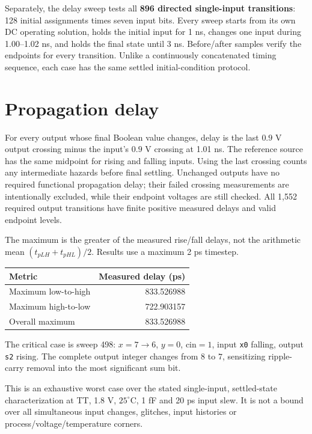 \documentclass[11pt,a4paper]{article}
\begin{document}
Separately, the delay sweep tests all \textbf{896 directed single-input
transitions}: 128 initial assignments times seven input bits. Every sweep
starts from its own DC operating solution, holds the initial input for
1 ns, changes one input during 1.00--1.02 ns, and holds the final state
until 3 ns. Before/after samples verify the endpoints for every transition.
Unlike a continuously concatenated timing sequence, each case has the same
settled initial-condition protocol.

\section*{Propagation delay}
For every output whose final Boolean value changes, delay is the last
$0.9$ V output crossing minus the input's $0.9$ V crossing at 1.01 ns.
The reference source has the same midpoint for rising and falling inputs.
Using the last crossing counts any intermediate hazards before final
settling. Unchanged outputs have no required functional propagation delay;
their failed crossing measurements are intentionally excluded, while their
endpoint voltages are still checked. All 1,552 required output transitions
have finite positive measured delays and valid endpoint levels.

The maximum is the greater of the measured rise/fall delays, not the
arithmetic mean $(t_{pLH}+t_{pHL})/2$. Results use a maximum 2 ps timestep.
\begin{center}\begin{tabular}{lr}
\toprule Metric&Measured delay (ps)\\\midrule
Maximum low-to-high&833.526988\\
Maximum high-to-low&722.903157\\
Overall maximum&833.526988\\\bottomrule
\end{tabular}\end{center}
The critical case is sweep 498: $x=7\to6$, $y=0$, $\mathrm{cin}=1$,
input \texttt{x0} falling, output \texttt{s2} rising. The complete output
integer changes from $8$ to $7$, sensitizing ripple-carry removal into the
most significant sum bit.

This is an exhaustive worst case over the stated single-input, settled-state
characterization at TT, 1.8 V, $25^\circ$C, 1 fF and 20 ps input slew.
It is not a bound over all simultaneous input changes, glitches, input
histories or process/voltage/temperature corners.
\end{document}
